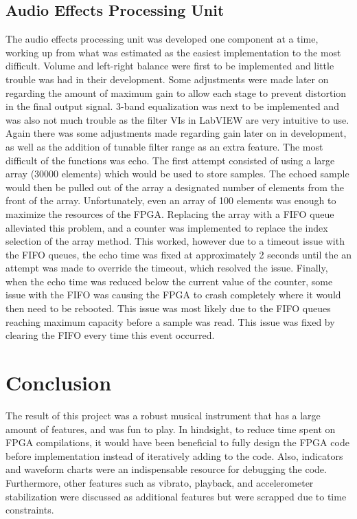 \subsection{Audio Effects Processing Unit}
The audio effects processing unit was developed one component at a time, working up from what was estimated as the easiest implementation to the most difficult. 
Volume and left-right balance were first to be implemented and little trouble was had in their development. Some adjustments were made later on regarding the amount of maximum gain to allow each stage to prevent distortion in the final output signal. 
3-band equalization was next to be implemented and was also not much trouble as the filter VIs in LabVIEW are very intuitive to use.
 Again there was some adjustments made regarding gain later on in development, as well as the addition of tunable filter range as an extra feature. 
The most difficult of the functions was echo. 
The first attempt consisted of using a large array (30000 elements) which would be used to store samples. 
The echoed sample would then be pulled out of the array a designated number of elements from the front of the array. Unfortunately, even an array of 100 elements was enough to maximize the resources of the FPGA. 
Replacing the array with a FIFO queue alleviated this problem, and a counter was implemented to replace the index selection of the array method. 
This worked, however due to a timeout issue with the FIFO queues, the echo time was fixed at approximately 2 seconds until the an attempt was made to override the timeout, which resolved the issue. 
Finally, when the echo time was reduced below the current value of the counter, some issue with the FIFO was causing the FPGA to crash completely where it would then need to be rebooted. 
This issue was most likely due to the FIFO queues reaching maximum capacity before a sample was read. 
This issue was fixed by clearing the FIFO every time this event occurred. 


\section{Conclusion}
The result of this project was a robust musical instrument that has a large amount of features, and was fun to play.
 In hindsight, to reduce time spent on FPGA compilations, it would have been beneficial to fully design the FPGA code before implementation instead of iteratively adding to the code.
 Also, indicators and waveform charts were an indispensable resource for debugging the code.
 Furthermore, other features such as vibrato, playback, and accelerometer stabilization were discussed as additional features but were scrapped due to time constraints.


